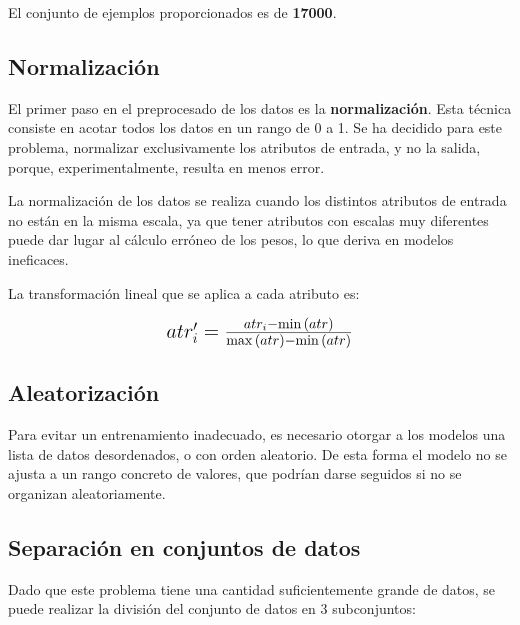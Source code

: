 \documentclass{uc3mpracticas}
\begin{document}
  El conjunto de ejemplos proporcionados es de \textbf{17000}.

  \subsection{Normalización}

  El primer paso en el preprocesado de los datos es la \textbf{normalización}. Esta técnica consiste en acotar todos los datos en un rango de 0 a 1. Se ha decidido para este problema, normalizar exclusivamente los atributos de entrada, y no la salida, porque, experimentalmente, resulta en menos error.

  \vspace{3mm}

  La normalización de los datos se realiza cuando los distintos atributos de entrada no están en la misma escala, ya que tener atributos con escalas muy diferentes puede dar lugar al cálculo erróneo de los pesos, lo que deriva en modelos ineficaces.

  \vspace{2mm}

  La transformación lineal que se aplica a cada atributo es:

  \begin{center}
    $$ \mbox{\Large $ atr'_i = \frac{atr_i - \min{(atr)}}{\max{(atr)} - \min{(atr)}} $} $$

  \end{center}



  \subsection{Aleatorización}

  Para evitar un entrenamiento inadecuado, es necesario otorgar a los modelos una lista de datos desordenados, o con orden aleatorio. De esta forma el modelo no se ajusta a un rango concreto de valores, que podrían darse seguidos si no se organizan aleatoriamente.

  \subsection{Separación en conjuntos de datos}

  Dado que este problema tiene una cantidad suficientemente grande de datos, se puede realizar la división del conjunto de datos en 3 subconjuntos:
\end{document}
